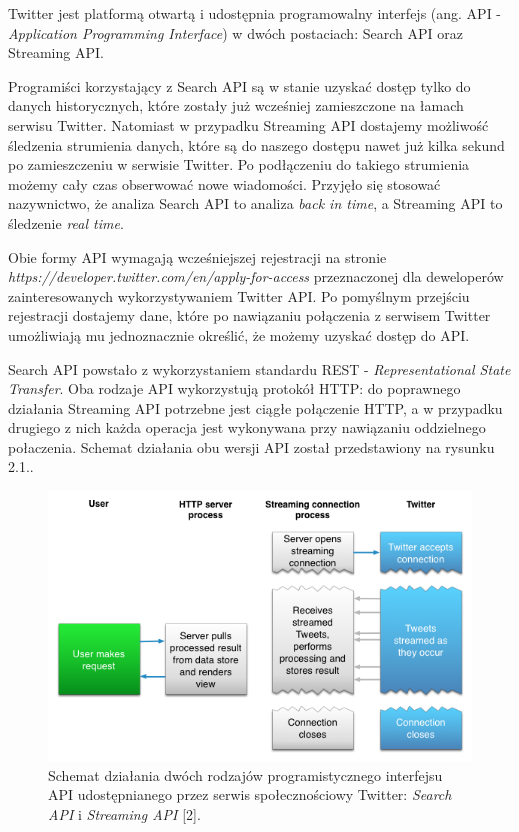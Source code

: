 Twitter jest platformą otwartą i udostępnia programowalny interfejs (ang. API - \textit{Application Programming Interface}) w dwóch postaciach: Search API oraz Streaming API.

Programiści korzystający z Search API są w stanie uzyskać dostęp tylko do danych historycznych, które zostały już wcześniej zamieszczone na łamach serwisu Twitter. Natomiast w przypadku Streaming API dostajemy możliwość śledzenia strumienia danych, które są do naszego dostępu nawet już kilka sekund po zamieszczeniu w serwisie Twitter. Po podłączeniu do takiego strumienia możemy cały czas obserwować nowe wiadomości. Przyjęło się stosować nazywnictwo, że analiza Search API to analiza \textit{back in time}, a Streaming API to śledzenie \textit{real time}. 

Obie formy API wymagają wcześniejszej rejestracji na stronie \textit{https://developer.twitter.com/en/apply-for-access} przeznaczonej dla deweloperów zainteresowanych wykorzystywaniem Twitter API. Po pomyślnym przejściu rejestracji dostajemy dane, które po nawiązaniu połączenia z serwisem Twitter umożliwiają mu jednoznacznie określić, że możemy uzyskać dostęp do API. 

Search API powstało z wykorzystaniem standardu REST - \textit{Representational State Transfer}. Oba rodzaje API wykorzystują protokół HTTP: do poprawnego działania Streaming API potrzebne jest ciągłe połączenie HTTP, a w przypadku drugiego z nich każda operacja jest wykonywana przy nawiązaniu oddzielnego połaczenia. Schemat działania obu wersji API został przedstawiony na rysunku 2.1..

\begin{figure}[h] %
	\centering
	\includegraphics[width=1.0\linewidth]{img/twitter_api_comparison}
	\caption{Schemat działania dwóch rodzajów programistycznego interfejsu API udostępnianego przez serwis społecznościowy Twitter: \textit{Search API} i \textit{Streaming API} [2].}
\end{figure}

